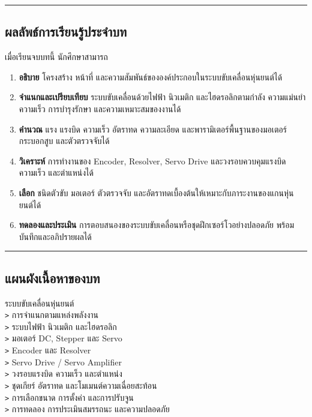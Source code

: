 \par\noindent\rule{\textwidth}{0.4pt}\par

\subsection{ผลลัพธ์การเรียนรู้ประจำบท}

เมื่อเรียนจบบทนี้ นักศึกษาสามารถ

\begin{enumerate}
    \item \textbf{อธิบาย} โครงสร้าง หน้าที่ และความสัมพันธ์ขององค์ประกอบในระบบขับเคลื่อนหุ่นยนต์ได้
    \item \textbf{จำแนกและเปรียบเทียบ} ระบบขับเคลื่อนด้วยไฟฟ้า นิวเมติก และไฮดรอลิกตามกำลัง ความแม่นยำ ความเร็ว การบำรุงรักษา และความเหมาะสมของงานได้
    \item \textbf{คำนวณ} แรง แรงบิด ความเร็ว อัตราทด ความละเอียด และพารามิเตอร์พื้นฐานของมอเตอร์ กระบอกสูบ และตัวตรวจจับได้
    \item \textbf{วิเคราะห์} การทำงานของ Encoder, Resolver, Servo Drive และวงรอบควบคุมแรงบิด ความเร็ว และตำแหน่งได้
    \item \textbf{เลือก} ชนิดตัวขับ มอเตอร์ ตัวตรวจจับ และอัตราทดเบื้องต้นให้เหมาะกับภาระงานของแกนหุ่นยนต์ได้
    \item \textbf{ทดลองและประเมิน} การตอบสนองของระบบขับเคลื่อนหรือชุดฝึกเซอร์โวอย่างปลอดภัย พร้อมบันทึกและอภิปรายผลได้
\end{enumerate}

\par\noindent\rule{\textwidth}{0.4pt}\par

\subsection{แผนผังเนื้อหาของบท}

ระบบขับเคลื่อนหุ่นยนต์ \\
\texttt{>} การจำแนกตามแหล่งพลังงาน \\
\texttt{>} ระบบไฟฟ้า นิวเมติก และไฮดรอลิก \\
\texttt{>} มอเตอร์ DC, Stepper และ Servo \\
\texttt{>} Encoder และ Resolver \\
\texttt{>} Servo Drive / Servo Amplifier \\
\texttt{>} วงรอบแรงบิด ความเร็ว และตำแหน่ง \\
\texttt{>} ชุดเกียร์ อัตราทด และโมเมนต์ความเฉื่อยสะท้อน \\
\texttt{>} การเลือกขนาด การตั้งค่า และการปรับจูน \\
\texttt{>} การทดลอง การประเมินสมรรถนะ และความปลอดภัย

